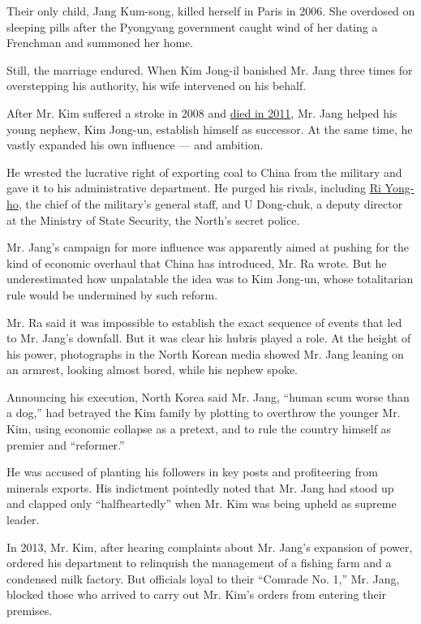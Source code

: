 Their only child, Jang Kum-song, killed herself in Paris in 2006. She
overdosed on sleeping pills after the Pyongyang government caught wind
of her dating a Frenchman and summoned her home.

Still, the marriage endured. When Kim Jong-il banished Mr. Jang three
times for overstepping his authority, his wife intervened on his behalf.

After Mr. Kim suffered a stroke in 2008 and
\href{http://www.nytimes3xbfgragh.onion/2011/12/19/world/asia/Kim-Jong-il-Dictator-Who-Turned-North-Korea-Into-a-Nuclear-State-Dies.html?pagewanted=all}{died
in 2011}, Mr. Jang helped his young nephew, Kim Jong-un, establish
himself as successor. At the same time, he vastly expanded his own
influence --- and ambition.

He wrested the lucrative right of exporting coal to China from the
military and gave it to his administrative department. He purged his
rivals, including
\href{http://www.nytimes3xbfgragh.onion/2012/07/16/world/asia/north-korea-removes-army-chief.html}{Ri
Yong-ho}, the chief of the military's general staff, and U Dong-chuk, a
deputy director at the Ministry of State Security, the North's secret
police.

Mr. Jang's campaign for more influence was apparently aimed at pushing
for the kind of economic overhaul that China has introduced, Mr. Ra
wrote. But he underestimated how unpalatable the idea was to Kim
Jong-un, whose totalitarian rule would be undermined by such reform.

Mr. Ra said it was impossible to establish the exact sequence of events
that led to Mr. Jang's downfall. But it was clear his hubris played a
role. At the height of his power, photographs in the North Korean media
showed Mr. Jang leaning on an armrest, looking almost bored, while his
nephew spoke.

Announcing his execution, North Korea said Mr. Jang, ``human scum worse
than a dog,'' had betrayed the Kim family by plotting to overthrow the
younger Mr. Kim, using economic collapse as a pretext, and to rule the
country himself as premier and ``reformer.''

He was accused of planting his followers in key posts and profiteering
from minerals exports. His indictment pointedly noted that Mr. Jang had
stood up and clapped only ``halfheartedly'' when Mr. Kim was being
upheld as supreme leader.

In 2013, Mr. Kim, after hearing complaints about Mr. Jang's expansion of
power, ordered his department to relinquish the management of a fishing
farm and a condensed milk factory. But officials loyal to their
``Comrade No. 1,'' Mr. Jang, blocked those who arrived to carry out Mr.
Kim's orders from entering their premises.

